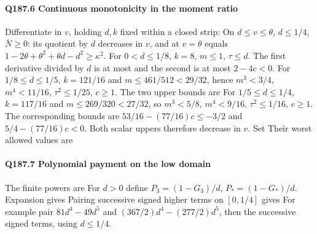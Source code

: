 \paragraph{Q187.6 Continuous monotonicity in the moment ratio}
Differentiate in $v$, holding $d,k$ fixed within a closed strip:
On $d\le v\le\theta$, $d\le1/4$, $\overline N\ge0$:
its quotient by $d$ decreases in $v$, and at $v=\theta$ equals
$1-2\theta+\theta^2+\theta d-d^2\ge\kappa^2$.
For $0<d\le1/8$, $k=8$, $m\le1$, $\tau\le d$. The first
derivative divided by $d$ is at most
and the second is at most $2-4c<0$.
For $1/8\le d\le1/5$, $k=121/16$ and
$m\le461/512<29/32$, hence $m^3<3/4$, $m^4<11/16$,
$\tau^2\le1/25$, $c\ge1$. The two upper bounds are
For $1/5\le d\le1/4$, $k=117/16$ and
$m\le269/320<27/32$, so $m^3<5/8$, $m^4<9/16$,
$\tau^2\le1/16$, $c\ge1$. The corresponding bounds are
$53/16-(77/16)c\le-3/2$ and $5/4-(77/16)c<0$.
Both scalar uppers therefore decrease in $v$. Set
Their worst allowed values are


\paragraph{Q187.7 Polynomial payment on the low domain}
The finite powers are
For $d>0$ define $P_3=(1-G_3)/d$, $P_*=(1-G_*)/d$. Expansion gives
Pairing successive signed higher terms on $[0,1/4]$ gives
For example pair $81d^4-49d^5$ and
$(367/2)d^4-(277/2)d^5$, then the successive signed terms,
using $d\le1/4$.


